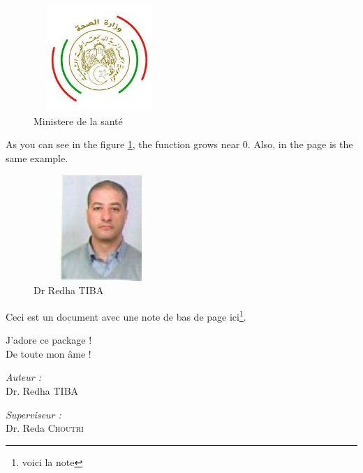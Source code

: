 \newpage
\begin{figure}[h]
\centering
\includegraphics[width=5cm, height=4cm]{img/msp.jpg}
\caption{Ministere de la santé}
\label{fig:mesh1}
\end{figure}

As you can see in the figure \ref{fig:mesh1}, the 
function grows near 0. Also, in the page \pageref{fig:mesh1} 
is the same example.


\begin{figure}[h]
\centering
\includegraphics[width=5cm, height=4cm]{img/redha.jpg}
\caption{Dr Redha TIBA}
\label{fig:mesh2}
\end{figure}



Ceci est un document avec une note de bas de page ici\footnote{voici la note}.

\newpage
\begin{tcolorbox}[colframe = orange, 
                  colback  = orange!50, 
                  boxrule  = 2pt, 
                  arc      = 6pt, 
                  title    = {Un titre}, 
                  coltitle = black] 
J'adore ce package ! \\ 
De toute mon âme ! 
\end{tcolorbox}

\begin{minipage}{0.45\linewidth} 
\begin{flushleft}  %
\Large\textit{Auteur :} \\ Dr. Redha \textsc{TIBA} %
\end{flushleft} 
\end{minipage} 
\hfill 
\begin{minipage}{0.45\linewidth} 
\begin{flushright} %
\Large\textit{Superviseur :} \\ Dr. Reda \textsc{Choutri} 
\end{flushright} 
\end{minipage} 
\newpage


